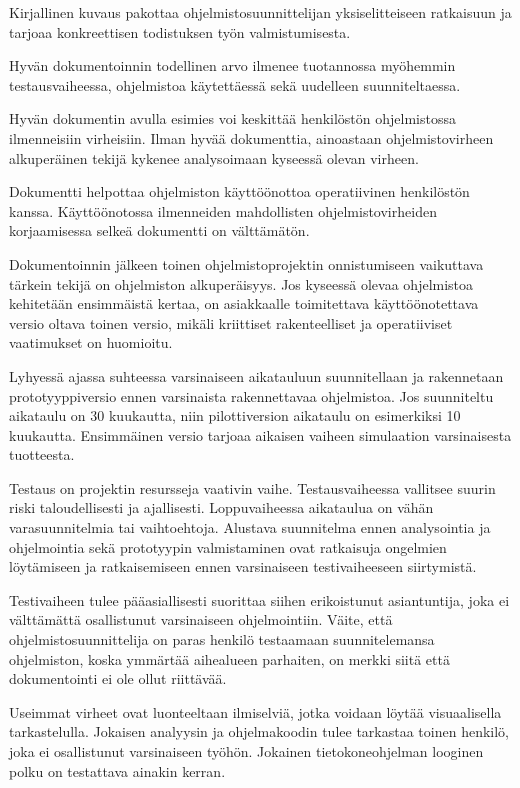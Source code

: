\documentclass[finnish]{tktltiki2}
\theoremstyle{definition}
\theoremstyle{remark}
\begin{document}
Kirjallinen kuvaus pakottaa ohjelmistosuunnittelijan yksiselitteiseen ratkaisuun ja tarjoaa konkreettisen todistuksen työn valmistumisesta\cite{ROY70}.

Hyvän dokumentoinnin todellinen arvo ilmenee tuotannossa myöhemmin testausvaiheessa, ohjelmistoa käytettäessä sekä uudelleen suunniteltaessa\cite{ROY70}.

Hyvän dokumentin avulla esimies voi keskittää henkilöstön ohjelmistossa ilmenneisiin virheisiin. Ilman hyvää dokumenttia, ainoastaan ohjelmistovirheen alkuperäinen tekijä kykenee analysoimaan kyseessä olevan virheen\cite{ROY70}.

Dokumentti helpottaa ohjelmiston käyttöönottoa operatiivinen henkilöstön kanssa. Käyttöönotossa ilmenneiden mahdollisten ohjelmistovirheiden korjaamisessa selkeä dokumentti on välttämätön\cite{ROY70}.   

Dokumentoinnin jälkeen toinen ohjelmistoprojektin onnistumiseen vaikuttava tärkein tekijä on ohjelmiston alkuperäisyys. Jos kyseessä olevaa ohjelmistoa kehitetään ensimmäistä kertaa, on asiakkaalle toimitettava käyttöönotettava versio oltava toinen versio, mikäli kriittiset rakenteelliset ja operatiiviset vaatimukset on huomioitu\cite{ROY70}. 

Lyhyessä ajassa suhteessa varsinaiseen aikatauluun suunnitellaan ja rakennetaan prototyyppiversio ennen varsinaista rakennettavaa ohjelmistoa. Jos suunniteltu aikataulu on 30 kuukautta, niin pilottiversion aikataulu on esimerkiksi 10 kuukautta. Ensimmäinen versio tarjoaa aikaisen vaiheen simulaation varsinaisesta tuotteesta\cite{ROY70}.

Testaus on projektin resursseja vaativin vaihe. Testausvaiheessa vallitsee suurin riski taloudellisesti ja ajallisesti. Loppuvaiheessa aikataulua on vähän varasuunnitelmia tai vaihtoehtoja. Alustava suunnitelma ennen analysointia ja ohjelmointia sekä prototyypin valmistaminen ovat ratkaisuja ongelmien löytämiseen ja ratkaisemiseen ennen varsinaiseen testivaiheeseen siirtymistä\cite{ROY70}.

Testivaiheen tulee pääasiallisesti suorittaa siihen erikoistunut asiantuntija, joka ei välttämättä osallistunut varsinaiseen ohjelmointiin. Väite, että ohjelmistosuunnittelija on paras henkilö      
testaamaan suunnitelemansa ohjelmiston, koska ymmärtää aihealueen parhaiten, on merkki siitä että dokumentointi ei ole ollut riittävää\cite{ROY70}. 

Useimmat virheet ovat luonteeltaan ilmiselviä, jotka voidaan löytää visuaalisella tarkastelulla. Jokaisen analyysin ja ohjelmakoodin tulee tarkastaa toinen henkilö, joka ei osallistunut varsinaiseen työhön. Jokainen tietokoneohjelman looginen polku on testattava ainakin kerran\cite{ROY70}.
 
\end{document}
